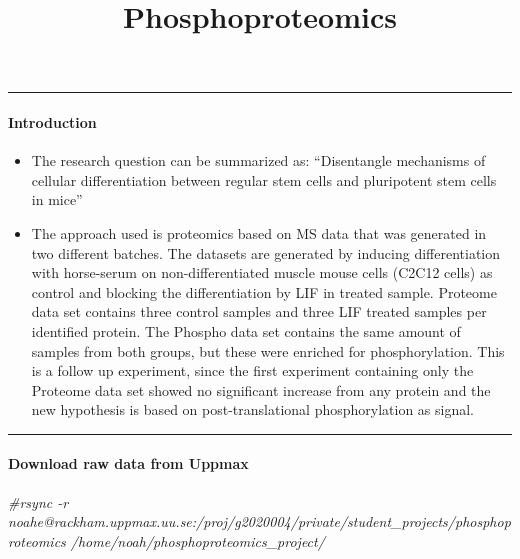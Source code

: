 \documentclass[
]{article}
\title{Phosphoproteomics}
\author{}
\date{\vspace{-2.5em}}
\newenvironment{Shaded}{\begin{snugshade}}{\end{snugshade}}
\newcommand{\CommentTok}[1]{\textcolor[rgb]{0.56,0.35,0.01}{\textit{#1}}}
\providecommand{\tightlist}{%
  \setlength{\itemsep}{0pt}\setlength{\parskip}{0pt}}
\begin{document}
\maketitle

\begin{center}\rule{0.5\linewidth}{0.5pt}\end{center}

\hypertarget{introduction}{%
\paragraph{Introduction}\label{introduction}}

\begin{itemize}
\tightlist
\item
  The research question can be summarized as: ``Disentangle mechanisms
  of cellular differentiation between regular stem cells and pluripotent
  stem cells in mice''
\item
  The approach used is proteomics based on MS data that was generated in
  two different batches. The datasets are generated by inducing
  differentiation with horse-serum on non-differentiated muscle mouse
  cells (C2C12 cells) as control and blocking the differentiation by LIF
  in treated sample. Proteome data set contains three control samples
  and three LIF treated samples per identified protein. The Phospho data
  set contains the same amount of samples from both groups, but these
  were enriched for phosphorylation. This is a follow up experiment,
  since the first experiment containing only the Proteome data set
  showed no significant increase from any protein and the new hypothesis
  is based on post-translational phosphorylation as signal.
\end{itemize}

\begin{center}\rule{0.5\linewidth}{0.5pt}\end{center}

\hypertarget{download-raw-data-from-uppmax}{%
\paragraph{Download raw data from
Uppmax}\label{download-raw-data-from-uppmax}}

\begin{Shaded}
\begin{Highlighting}[]

\CommentTok{\#rsync {-}r noahe@rackham.uppmax.uu.se:/proj/g2020004/private/student\_projects/phosphoproteomics /home/noah/phosphoproteomics\_project/}
\end{Highlighting}
\end{Shaded}
\end{document}

